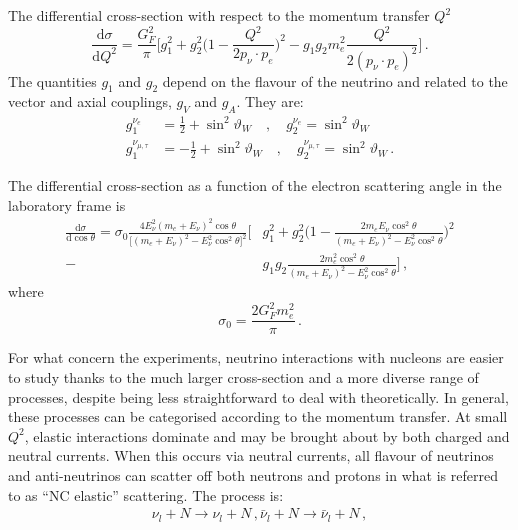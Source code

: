The differential cross-section with respect to the momentum transfer $Q^2$
\begin{equation}
	\frac{\mathrm{d}\sigma}{\mathrm{d}Q^2} = \frac{G_F^2}{\pi}\bigg[g_1^2 + g_2^2\bigg(1 - %
	\frac{Q^2}{2p_\nu \cdot p_e} \bigg)^2 - g_1 g_2 m_e^2 \frac{Q^2}{2 (p_\nu \cdot p_e)^2} \bigg]\,.
\end{equation}
The quantities $g_1$ and $g_2$ depend on the flavour of the neutrino and related to the vector and axial couplings, %
$g_V$ and $g_A$.
They are:
\begin{align}
	g_1^{\nu_e} &= \frac{1}{2} + \sin^2\vartheta_W \quad , \quad
	g_2^{\nu_e} = \sin^2\vartheta_W \\
	g_1^{\nu_{\mu,\tau}} &= -\frac{1}{2} + \sin^2\vartheta_W \quad , \quad
	g_2^{\nu_{\mu,\tau}} = \sin^2\vartheta_W\,.
\end{align}

The differential cross-section as a function of the electron scattering angle in the laboratory frame is
\begin{equation}
	\begin{split}
		\frac{\mathrm{d}\sigma}{\mathrm{d}\cos\theta} = \sigma_0 \frac{4 E_\nu^2 (m_e+E_\nu)^2 \cos \theta}%
		{\big[(m_e+E_\nu)^2-E_\nu^2 \cos^2 \theta \big]^2} \bigg[&g_1^2 + g_2^2\bigg(1 - %
		\frac{2 m_e E_\nu \cos^2 \theta}{(m_e+E_\nu)^2-E_\nu^2 \cos^2 \theta} \bigg)^2 \\
		- &g_1 g_2 \frac{2m_e^2 \cos^2 \theta}{(m_e+E_\nu)^2-E_\nu^2 \cos^2 \theta} \bigg]\,,
	\end{split}
\end{equation}
where 
\begin{equation}
	\sigma_0 = \frac{2 G_F^2 m_e^2}{\pi}\,.
\end{equation}

For what concern the experiments, neutrino interactions with nucleons are easier to study thanks to the %
much larger cross-section and a more diverse range of processes, despite being less straightforward to %
deal with theoretically.
In general, these processes can be categorised according to the momentum transfer.
At small $Q^2$, elastic interactions dominate and may be brought about by both charged and neutral currents.
When this occurs via neutral currents, all flavour of neutrinos and anti-neutrinos can scatter off %
both neutrons and protons in what is referred to as ``NC elastic'' scattering.
The process is:
\begin{align}
	\nu_l + N \rightarrow \nu_l + N\,,
	\bar\nu_l + N \rightarrow \bar\nu_l + N\,,
\end{align}

